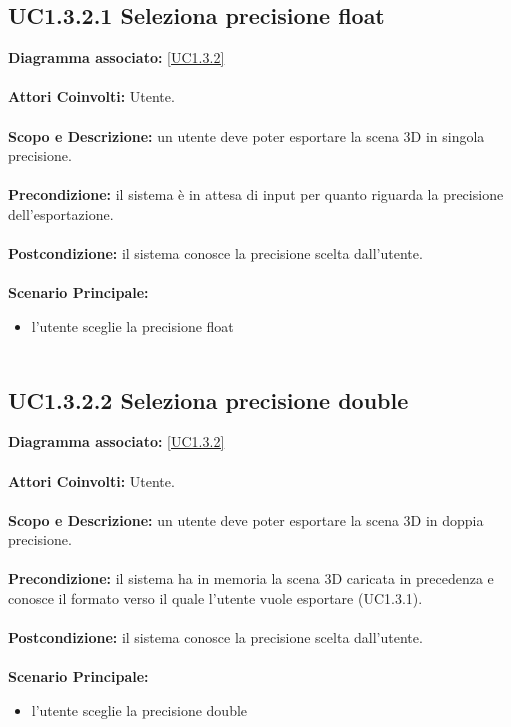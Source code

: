 \subsection{UC1.3.2.1 Seleziona precisione float}
\textbf{Diagramma associato:}
\ref{UC1.3.2} \\ \\
\textbf{Attori Coinvolti:}
Utente. \\ \\
\textbf{Scopo e Descrizione:}
un utente deve poter esportare la scena 3D in singola precisione. \\ \\
\textbf{Precondizione:}
il sistema è in attesa di input per quanto riguarda la precisione dell'esportazione. \\ \\
\textbf{Postcondizione:}
il sistema conosce la precisione scelta dall’utente. \\ \\
\textbf{Scenario Principale:}
\begin{itemize}
\item l'utente sceglie la precisione float
\\ \\ \end{itemize}


\subsection{UC1.3.2.2 Seleziona precisione double}
\textbf{Diagramma associato:}
\ref{UC1.3.2} \\ \\
\textbf{Attori Coinvolti:}
Utente. \\ \\
\textbf{Scopo e Descrizione:}
un utente deve poter esportare la scena 3D in doppia precisione. \\ \\
\textbf{Precondizione:}
il sistema ha in memoria la scena 3D caricata in precedenza e conosce il formato verso il quale l’utente vuole esportare (UC1.3.1). \\ \\
\textbf{Postcondizione:}
il sistema conosce la precisione scelta dall’utente. \\ \\
\textbf{Scenario Principale:}
\begin{itemize}
\item l'utente sceglie la precisione double
\\ \\ \end{itemize}


